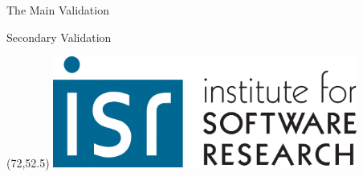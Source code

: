 \documentclass[final]{beamer}
\theoremstyle{definition}
\begin{document}
\begin{frame}[fragile]
\begin{textblock}{51}
\begin{block}{The Main Validation}
\end{block}

\begin{block}{Secondary Validation}
\end{block}


\begin{textblock}{10}(72,52.5)
\includegraphics[width=10cm]{images/isr.png}
\end{textblock}


\end{textblock}

\end{frame}
\end{document}
